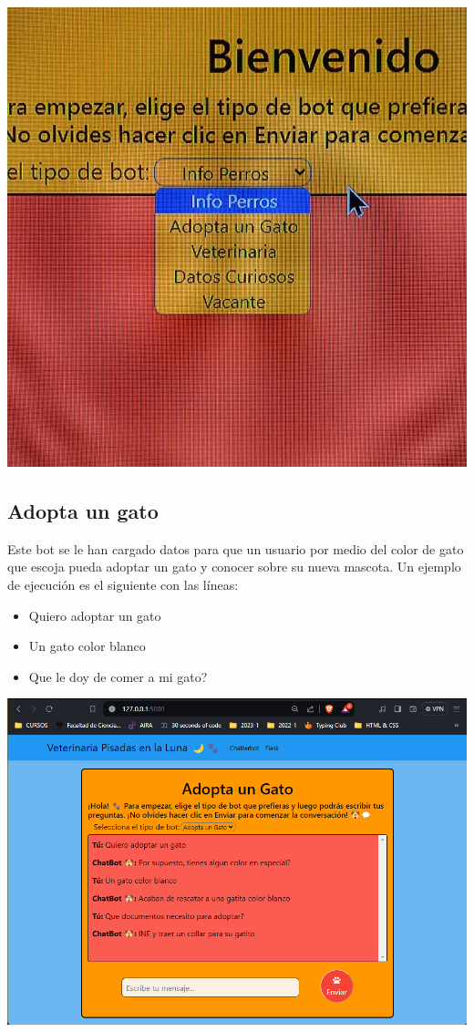 \begin{center}
    \includegraphics[scale = .2]{IMA/optiones.jpg}
\end{center}

\subsection{Adopta un gato}

Este bot se le han cargado datos para que un usuario por medio del color 
de gato que escoja pueda adoptar un gato y conocer sobre su nueva mascota. Un ejemplo 
de ejecución es el siguiente con las líneas:

\begin{itemize}
    \item Quiero adoptar un gato
    \item Un gato color blanco
    \item Que le doy de comer a mi gato?
\end{itemize}

\begin{center}
    \includegraphics[scale = .5]{IMA/gato.png}
\end{center}

